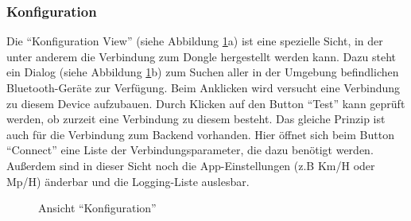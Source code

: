 \subsubsection{Konfiguration}
\label{sec:appSichtKonfiguration}

Die \enquote{Konfiguration View} (siehe Abbildung \ref{fig:APP_Configuration}a) ist eine spezielle Sicht, in der unter anderem die Verbindung zum Dongle hergestellt werden kann. Dazu steht ein Dialog (siehe Abbildung \ref{fig:APP_Configuration}b) zum Suchen aller in der Umgebung befindlichen Bluetooth-Geräte zur Verfügung. Beim Anklicken wird versucht eine Verbindung zu diesem Device aufzubauen. Durch Klicken auf den Button \enquote{Test} kann geprüft werden, ob zurzeit eine Verbindung zu diesem besteht. Das gleiche Prinzip ist auch für die Verbindung zum Backend vorhanden. Hier öffnet sich beim Button \enquote{Connect} eine Liste der Verbindungsparameter, die dazu benötigt werden. Außerdem sind in dieser Sicht noch die App-Einstellungen (z.B Km/H oder Mp/H) änderbar und die Logging-Liste auslesbar.

\begin{figure}[H]
	\centering
    \label{fig:APP_Configuration_View}
    \hspace{1cm}
	\label{fig:App_Bluetooth_Search}
	\caption{Ansicht \enquote{Konfiguration}}
	\label{fig:APP_Configuration}
\end{figure}


